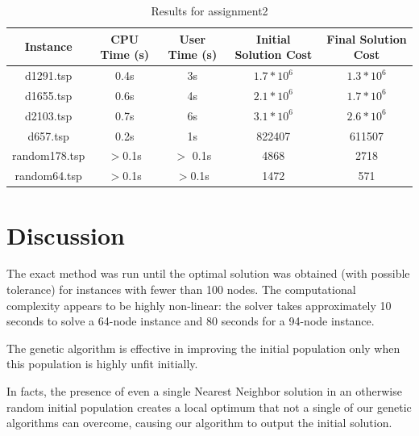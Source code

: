\documentclass[11pt,letterpaper]{article}
\begin{document}
\begin{table}
    \centering
    \begin{tabular}{@{}ccccc@{}}
        \toprule
        \textbf{Instance} & \textbf{CPU Time (s)} & \textbf{User Time (s)} & \textbf{Initial Solution Cost} & \textbf{Final Solution Cost} \\ \midrule
        d1291.tsp        &             0.4s      &    3s                 &      $1.7 * 10^{6}$        &         $1.3 * 10^{6}$ \\
        d1655.tsp        &             0.6s      &         4s           &         $2.1 * 10^{6}$          &                $1.7 * 10^{6}$               \\
        d2103.tsp        &          0.7s         &           6s         &      $3.1 * 10^{6}$               &       $2.6 * 10^{6}$                        \\
        d657.tsp         &           0.2s        &         1s           &        822407               &         611507                    \\
        random178.tsp    &         $>$0.1s          &      $>$ 0.1s              &          4868         &           2718                  \\
        random64.tsp     &         $>$0.1s          &                $>$0.1s    &      1472             &         571                    \\ \bottomrule
    \end{tabular}
    \caption{Results for assignment2}
    \label{tab:results2}
\end{table}


\section{Discussion}
The exact method was run until the optimal solution was obtained (with possible tolerance) for instances with fewer than 100 nodes. The computational complexity appears to be highly non-linear: the solver takes approximately 10 seconds to solve a 64-node instance and 80 seconds for a 94-node instance.


The genetic algorithm is effective in improving the initial population only when this population is highly unfit initially.

In facts, the presence of even a single Nearest Neighbor solution in an otherwise random initial population creates a local optimum that not a single of our genetic algorithms can overcome, causing our algorithm to output the initial solution.
\end{document}
